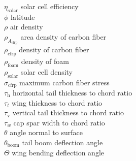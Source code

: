 \begin{tabbing}
$\eta_{\text{solar}}$ \> solar cell efficiency \\
$\phi$ \> latitude \\
$\rho$ \> air density \\ %
$\rho_{A_{\text{cfrp}}}$ \> area density of carbon fiber \\ %
$\rho_{\text{cfrp}}$ \> density of carbon fiber \\ %
$\rho_{\text{foam}}$ \> density of foam \\ %
$\rho_{\text{solar}}$ \> solar cell density \\ %
$\sigma_{\text{cfrp}}$ \> maximum carbon fiber stress \\ %
$\tau_{\text{h}}$ \> horizontal tail thickness to chord ratio \\
$\tau_t$ \> wing thickness to chord ratio \\
$\tau_{\text{v}}$ \> vertical tail thickness to chord ratio \\
$\tau_w$ \> cap spar width to chord ratio \\
$\theta$ \> angle normal to surface \\
$\theta_{\text{boom}}$ \> tail boom deflection angle \\
$\Theta$ \> wing bending deflection angle 
 \end{tabbing}
